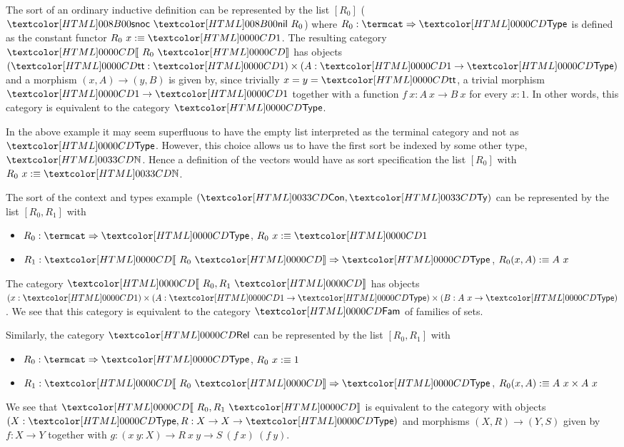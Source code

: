 \begin{example}
  The sort of an ordinary inductive definition can be represented by
  the list $[R_0]$ (\ie $\sortssnoc\ \sortsnil\ R_0$) where
  $R_0 : \Func{\termcat}{\Type}$ is defined as the constant functor
  $R_0\ x \ddefeq \unitty$. The resulting category $\SortCat{R_0}$ has
  objects $(\unitval : \unitty) \times (A : \unitty \to \Type)$ and a
  morphism $(x, A) \to (y, B)$ is given by, since trivially
  $x = y = \unitval$, a trivial morphism $\unitty \to \unitty$
  together with a function $f\ x : A\ x \to B\ x$ for every $x : 1$. In
  other words, this category is equivalent to the category $\Type$.
\end{example}

In the above example it may seem superfluous to have the empty list
interpreted as the terminal category and not as $\Type$. However, this
choice allows us to have the first sort be indexed by some other type,
\eg $\natty$. Hence a definition of the vectors would have as sort
specification the list $[R_0]$ with $R_0\ x \ddefeq \natty$.

\begin{example}
  The sort of the context and types example $(\ttconty, \tttyty)$ can be
  represented by the list $[R_0, R_1]$ with
  \begin{itemize}
  \item $R_0 : \Func{\termcat}{\Type}$, $R_0\ x \ddefeq \unitty$
  \item $R_1 : \Func{\SortCat{R_0}}{\Type}$, $R_0 (x, A) :\equiv A\ x$
  \end{itemize}
  The category $\SortCat{R_0,R_1}$ has objects
  $(x : \unitty) \times (A : \unitty \to \Type) \times (B : A\ x \to
  \Type)$.
  We see that this category is equivalent to the category $\Fam$ of
  families of sets.
\end{example}

\begin{example}
  \label{ex:rel}
  Similarly, the category $\Rel$ can be represented by the list
  $[R_0, R_1]$ with
  \begin{itemize}
  \item $R_0 : \Func{\termcat}{\Type}$, $R_0\ x :\equiv 1$
  \item $R_1 : \Func{\SortCat{R_0}}{\Type}$, $R_0 (x, A) :\equiv A\ x \times A\ x$
  \end{itemize}
  We see that $\SortCat{R_0,R_1}$ is equivalent to the category with
  objects $(X : \Type, R : X \to X \to \Type)$ and morphisms
  $(X,R) \to (Y,S)$ given by $f : X \to Y$ together with
  $g : (x\ y: X) \to R\ x\ y \to S\ (f\ x)\ (f\ y)$.
\end{example}

